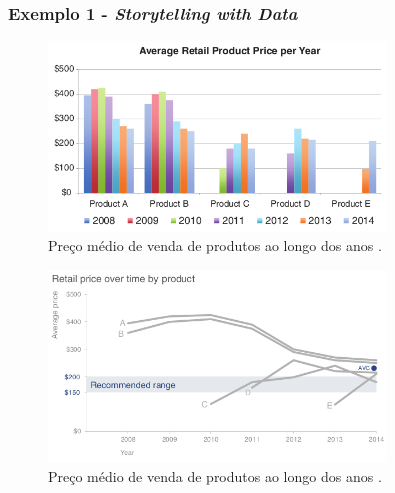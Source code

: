 \begin{frame}[allowframebreaks]
\frametitle{Exemplo 1 - \emph{Storytelling with Data}}
\begin{figure}[h]
 \centering
 \includegraphics[width=0.8\textwidth,height=0.6\textheight,keepaspectratio]{figures/storytelling_data_ex01a.png}
 \caption{Preço médio de venda de produtos ao longo dos anos \cite{knaflic_storytelling_2015}.}
 \label{fig-storytelling_data_ex01a}
\end{figure}
\framebreak
\begin{figure}[h]
 \centering
 \includegraphics[width=0.8\textwidth,height=0.7\textheight,keepaspectratio]{figures/storytelling_data_ex01b.png}
 \caption{Preço médio de venda de produtos ao longo dos anos \cite{knaflic_storytelling_2015}.}
 \label{fig-storytelling_data_ex01b}
\end{figure}
\end{frame}



